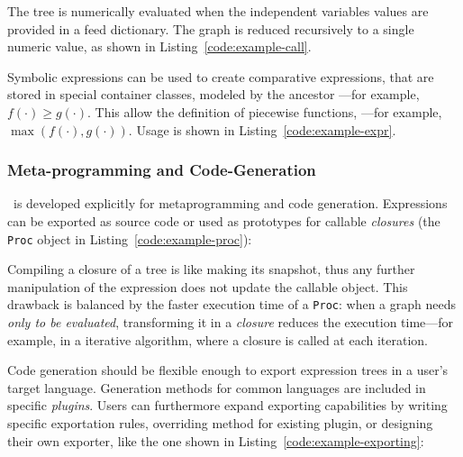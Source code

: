 \noindent%


The tree is numerically evaluated when the independent variables values are provided in a feed dictionary. The graph is reduced recursively to a single numeric value, as shown in Listing~\ref{code:example-call}.

\noindent%



Symbolic expressions can be used to create comparative expressions, that are stored in special container classes, modeled by the ancestor \CASExpression---for example, $f(\cdot) \geq g(\cdot)$. This allow the definition of piecewise functions, ---for example, $\max(f(\cdot), g(\cdot))$. Usage is shown in Listing~\ref{code:example-expr}.

\noindent%


\subsubsection{Meta-programming and Code-Generation}

\ragnicas~is developed explicitly for {meta\-programming} and code generation. Expressions can be exported as source code or used as prototypes for callable \emph{closures} (the \texttt{Proc} object in Listing~\ref{code:example-proc}):

\noindent%


Compiling a closure of a tree is like making its snapshot, thus any further manipulation of the expression does not update the callable object. This drawback is balanced by the faster execution time of a \texttt{Proc}: when a graph needs \emph{only to be evaluated}, transforming it in a \emph{closure} reduces the execution time---for example, in a iterative algorithm, where a closure is called at each iteration.

Code generation should be flexible enough to export expression trees in a user's target language. Generation methods for common languages are included in specific \emph{plugins}. Users can furthermore expand exporting capabilities by writing specific exportation rules, overriding method for existing plugin, or designing their own exporter, like the one shown in Listing~\ref{code:example-exporting}:

\noindent%

